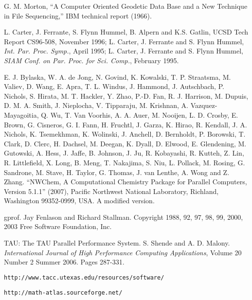 \documentclass[letterpaper,12pt]{article}
\begin{document}
\begin{thebibliography}{99}

G. M. Morton, ``A Computer Oriented Geodetic Data Base and a New Technique in File Sequencing,'' IBM technical report (1966).

L. Carter, J. Ferrante, S. Flynn Hummel, B. Alpern and K.S. Gatlin, UCSD Tech Report CS96-508, November 1996;
L. Carter, J. Ferrante and S. Flynn Hummel, \textit{Int. Par. Proc. Symp.}, April 1995;
L. Carter, J. Ferrante and S. Flynn Hummel, \textit{SIAM Conf. on Par. Proc. for Sci. Comp.}, February 1995.

E. J. Bylaska, W. A. de Jong, N. Govind, K. Kowalski, T. P. Straatsma, M. Valiev, D. Wang, E. Apra, T. L. Windus, J. Hammond, J. Autschbach, P. Nichols, S. Hirata, M. T. Hackler, Y. Zhao, P.-D. Fan, R. J. Harrison, M. Dupuis, D. M. A. Smith, J. Nieplocha, V. Tipparaju,  M. Krishnan, A. Vazquez-Mayagoitia, Q. Wu, T. Van Voorhis, A. A. Auer,  M. Nooijen, L. D. Crosby, E. Brown, G. Cisneros, G. I. Fann,  H. Fruchtl, J. Garza, K. Hirao, R. Kendall, J. A. Nichols, K. Tsemekhman, K. Wolinski, J. Anchell, D. Bernholdt, P. Borowski,  T. Clark, D. Clerc, H. Dachsel, M. Deegan, K. Dyall, D. Elwood, E. Glendening, M. Gutowski, A. Hess, J. Jaffe, B. Johnson, J. Ju, R. Kobayashi, R. Kutteh, Z. Lin, R. Littlefield, X. Long, B. Meng,  T. Nakajima, S. Niu, L. Pollack, M. Rosing, G. Sandrone, M. Stave, H. Taylor, G. Thomas, J. van Lenthe, A. Wong and Z. Zhang. ``NWChem, A Computational Chemistry Package for Parallel Computers, Version 5.1.1'' (2007), Pacific Northwest National Laboratory, Richland, Washington 99352-0999, USA.  A modified version.

gprof.  Jay Fenlason and Richard Stallman.  Copyright 1988, 92, 97, 98, 99, 2000, 2003 Free Software Foundation, Inc.

TAU: The TAU Parallel Performance System.  S. Shende and A. D. Malony. \textit{International Journal of High Performance Computing Applications}, Volume 20 Number 2 Summer 2006. Pages 287-331.

\texttt{http://www.tacc.utexas.edu/resources/software/}

\texttt{http://math-atlas.sourceforge.net/}


\end{thebibliography}
\end{document}
